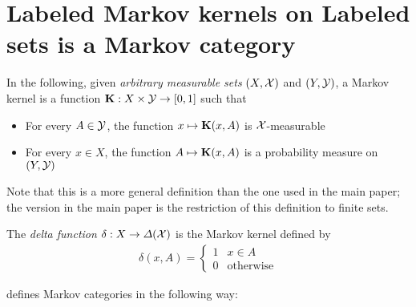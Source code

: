 \section{Labeled Markov kernels on Labeled sets is a Markov category}

In the following, given \emph{arbitrary measurable sets} $(X,\mathcal{X})$ and $(Y,\mathcal{Y})$, a Markov kernel is a function $\mathbf{K}:X\times\mathcal{Y}\to [0,1]$ such that

\begin{itemize}
    \item For every $A\in \mathcal{Y}$, the function $x\mapsto \mathbf{K}(x,A)$ is $\mathcal{X}$-measurable
    \item For every $x\in X$, the function $A\mapsto \mathbf{K}(x,A)$ is a probability measure on $(Y,\mathcal{Y})$
\end{itemize}

Note that this is a more general definition than the one used in the main paper; the version in the main paper is the restriction of this definition to finite sets.

The \emph{delta function} $\delta:X\to\Delta(\mathcal{X})$ is the Markov kernel defined by
\begin{align}
    \delta(x,A) = \begin{cases}
        1 & x\in A\\
        0 & \text{otherwise}
    \end{cases}
\end{align}

\citet{fritz_synthetic_2020} defines Markov categories in the following way:

